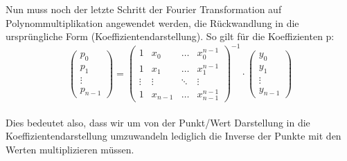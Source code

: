 \documentclass[
../AuD-Zusammenfassung.tex,
]
{subfiles}
\begin{document}
Nun muss noch der letzte Schritt der Fourier Transformation auf Polynommultiplikation angewendet werden, die Rückwandlung in die ursprüngliche Form (Koeffizientendarstellung). So gilt für die Koeffizienten p:\\
\[
\begin{pmatrix}
    p_0 \\
    p_1 \\
    \vdots \\
    p_{n-1}
\end{pmatrix}
=
\begin{pmatrix}
    1 & x_0 & \ldots & x_0^{n-1} \\
    1 & x_1 & \ldots & x_1^{n-1} \\
    \vdots & \vdots & \ddots & \vdots \\
    1 & x_{n-1} & \ldots & x_{n-1}^{n-1} 
\end{pmatrix}^{-1}
\cdot 
\begin{pmatrix}
    y_0 \\
    y_1 \\
    \vdots \\
    y_{n-1}
\end{pmatrix}
\]\\
Dies bedeutet also, dass wir um von der Punkt/Wert Darstellung in die Koeffizientendarstellung umzuwandeln lediglich die Inverse der Punkte mit den Werten multiplizieren müssen.
\end{document}
